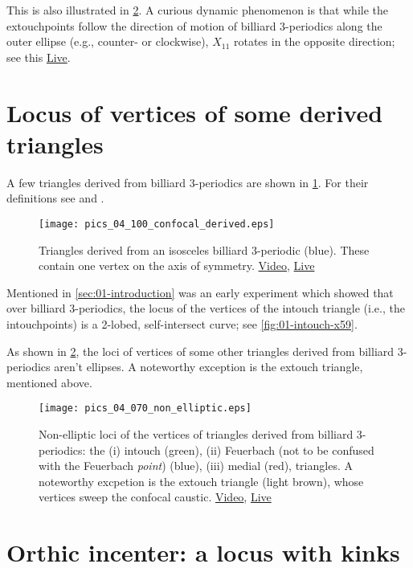 This is also illustrated in \cref{fig:04-locus-x11-x100}. A curious dynamic phenomenon is that while the extouchpoints follow the direction of motion of billiard 3-periodics along the outer ellipse (e.g., counter- or clockwise), $X_{11}$ rotates in the opposite direction; see this \href{https://bit.ly/2S2LVqp}{Live}.



\section{Locus of vertices of some derived triangles}

A few triangles derived from billiard 3-periodics are shown in \cref{fig:04-derived-isosceles}. For their definitions see \cite{app:app-triangle} and \cite{mw}.

\begin{figure}
    \centering
    \texttt{[image: pics\_04\_100\_confocal\_derived.eps]}
    \caption{Triangles derived from an isosceles billiard 3-periodic (blue). These contain one vertex on the axis of symmetry. \href{https://youtu.be/xyroRTEVNDc}{Video}, \href{https://bit.ly/3fyylD0}{Live}}
    \label{fig:04-derived-isosceles}
\end{figure}

Mentioned in \cref{sec:01-introduction} was an early experiment which showed that over billiard 3-periodics, the locus of the vertices of the intouch triangle (i.e., the intouchpoints) is a 2-lobed, self-intersect curve; see \cref{fig:01-intouch-x59}.

As shown in \cref{fig:04-locus-x11-x100}, the loci of vertices of some other triangles derived from billiard 3-periodics aren't ellipses. A noteworthy exception is the extouch triangle, mentioned above.

\begin{figure}
    \centering
    \texttt{[image: pics\_04\_070\_non\_elliptic.eps]}
    \caption{Non-elliptic loci of the vertices of triangles derived from billiard 3-periodics: the (i) intouch (green), (ii) Feuerbach (not to be confused with the Feuerbach {\em point}) (blue), (iii) medial (red), triangles. A noteworthy excpetion is the extouch triangle (light brown), whose vertices sweep the confocal caustic.
     \href{https://youtu.be/OGvCQbYqJyI}{Video}, \href{https://bit.ly/3orrSxQ}{Live}}
    \label{fig:04-locus-x11-x100}
\end{figure}

\section{Orthic incenter: a locus with kinks}

